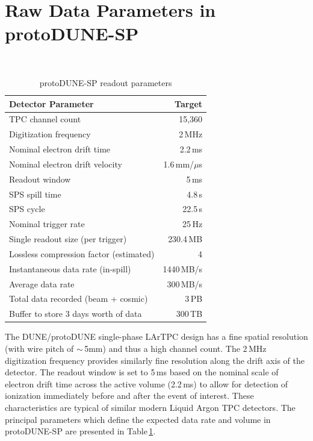 \documentclass{PoS}
\newcommand{\pd}{protoDUNE\xspace}
\begin{document}
\section{Raw Data Parameters in protoDUNE-SP}
\label{sec:np04_data_rate}
\begin{table}
\begin{center}
\caption{\label{table:np04_data_rate}
  protoDUNE-SP readout parameters}
\ \\
\begin{tabularx}{0.75\textwidth}{ X  >{\setlength{\hsize}{0.8\hsize}}r}
\hline
Detector Parameter & Target \\
\hline
TPC channel count & 15,360 \\
Digitization frequency & 2\,MHz \\
Nominal electron drift time & 2.2\,ms\\
Nominal electron drift velocity & 1.6\,mm/$\mu$s\\
Readout window & 5\,ms \\
SPS spill time& 4.8\,s\\
SPS cycle& 22.5\,s\\
Nominal trigger rate & 25\,Hz \\
Single readout size (per trigger) & 230.4\,MB \\
Lossless compression factor (estimated) & 4 \\
Instantaneous data rate (in-spill) & 1440\,MB/s \\
Average data rate & 300\,MB/s \\
Total data recorded (beam + cosmic) & 3\,PB\\
Buffer to store 3 days worth of data & 300\,TB\\
\hline
\end{tabularx}
\end{center}
\end{table}

The DUNE/\pd single-phase LArTPC design has a fine spatial resolution (with wire pitch of $\sim$\,5mm)
and thus a high channel count. The 2\,MHz digitization frequency provides similarly fine
resolution along the drift axis of the detector. The readout window is  set to 5\,ms 
based on the nominal scale of electron drift time across the active volume (2.2\,ms) to allow for detection
of ionization immediately before and after the event of interest.  These characteristics are typical of
similar modern Liquid Argon TPC detectors. The principal parameters which define the expected data rate and
volume in protoDUNE-SP are presented  in Table\,\ref{table:np04_data_rate}.
\end{document}
